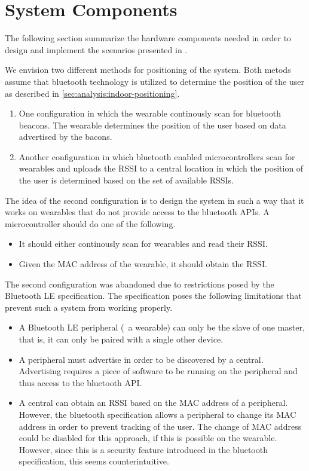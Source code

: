 \section{System Components}
\label{sec:analysis:system-components}

The following section summarize the hardware components needed in order to design and implement the scenarios presented in .

We envision two different methods for positioning of the system. Both metods assume that bluetooth technology is utilized to determine the position of the user as described in \cref{sec:analysis:indoor-positioning}.

\begin{enumerate}
\item One configuration in which the wearable continously scan for bluetooth beacons. The wearable determines the position of the user based on data advertised by the bacons.
\item Another configuration in which bluetooth enabled microcontrollers scan for wearables and uploads the RSSI to a central location in which the position of the user is determined based on the set of available RSSIs.
\end{enumerate}

The idea of the second configuration is to design the system in such a way that it works on wearables that do not provide access to the bluetooth APIs. A microcontroller should do one of the following.

\begin{itemize}
\item It should either continously scan for wearables and read their RSSI.
\item Given the MAC address of the wearable, it should obtain the RSSI.
\end{itemize}

The second configuration was abandoned due to restrictions posed by the Bluetooth LE specification. The specification poses the following limitations that prevent such a system from working properly.

\begin{itemize}
\item A Bluetooth LE peripheral (\eg~a wearable) can only be the slave of one master, that is, it can only be paired with a single other device.
\item A peripheral must advertise in order to be discovered by a central. Advertising requires a piece of software to be running on the peripheral and thus access to the bluetooth API.
\item A central can obtain an RSSI based on the MAC address of a peripheral. However, the bluetooth specification allows a peripheral to change its MAC address in order to prevent tracking of the user\cite[p.~91]{bluetooth2010bluetooth_vol_1}. The change of MAC address could be disabled for this approach, if this is possible on the wearable. However, since this is a security feature introduced in the bluetooth specification, this seems counterintuitive.
\end{itemize}

